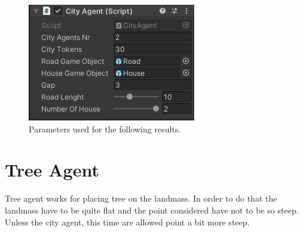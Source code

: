 \documentclass[12pt]{article}
\begin{document}
    \begin{figure}[H]
        \centering
        \includegraphics[scale = 0.8]{images/City Agent/2/Parameters}
        \caption{Parameters used for the following results.}
    \end{figure}

    \begin{figure}[H]
        \centering     %
    \end{figure}

    \newpage

    \section{Tree Agent}
    Tree agent works for placing tree on the landmass. In order to do that the landmass have to be quite flat and the point considered have not to be so steep. Unless the city agent,
    this time are allowed point a bit more steep. 
\end{document}
